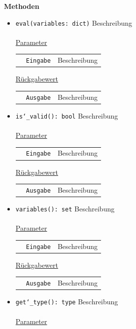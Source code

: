 \documentclass{article}
\begin{document}
\textbf{{Methoden}}
\begin{itemize}
\item \texttt{eval(variables: dict)} \newline Beschreibung
\\\\
\underline{{Parameter}}

\begin{tabular}{lll}
 & \texttt{Eingabe} & Beschreibung \\
\end{tabular}

\underline{{Rückgabewert}}

\begin{tabular}{lll}
 & \texttt{Ausgabe} & Beschreibung \\
\end{tabular}

\item \texttt{is\char`_valid(): bool} \newline Beschreibung
\\\\
\underline{{Parameter}}

\begin{tabular}{lll}
 & \texttt{Eingabe} & Beschreibung \\
\end{tabular}

\underline{{Rückgabewert}}

\begin{tabular}{lll}
 & \texttt{Ausgabe} & Beschreibung \\
\end{tabular}

\item \texttt{variables(): set} \newline Beschreibung
\\\\
\underline{{Parameter}}

\begin{tabular}{lll}
 & \texttt{Eingabe} & Beschreibung \\
\end{tabular}

\underline{{Rückgabewert}}

\begin{tabular}{lll}
 & \texttt{Ausgabe} & Beschreibung \\
\end{tabular}

\item \texttt{get\char`_type(): type} \newline Beschreibung
\\\\
\underline{{Parameter}}


\end{itemize}
\end{document}
